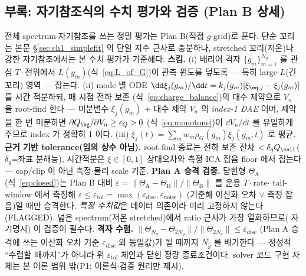 \subsection{부록: 자기참조식의 수치 평가와 검증 (Plan B 상세)}\label{sec:ch1_numeric}
전체 spectrum$\cdot$자기참조를 쓰는 정밀 평가는 Plan B(직접 $g$-grid)로 푼다. 단순 꼬리는 본문
\S\ref{sec:ch1_simplefit} 의 단일 지수 근사로 충분하나, stretched 꼬리(저온)나 강한 자기참조에서는 본 수치
평가가 기준해다.
\textbf{스킴.} (i) 배리어 격자 $\{g_m\}_{m=1}^{N_g}$ 를 관심 $T\cdot$전위에서 $L(g_m)$(식~\eqref{eq:L_of_G})이
관측 윈도를 덮도록 — 특히 large-$L$(긴 꼬리) 영역 — 잡는다. (ii) mode 별 ODE
$\dd\xi_j(g_m)/\dd t=k_j(g_m)[\xi_{\eq,j}-\xi_j(g_m)]$ 를 시간 적분하되, 매 시점 전하 보존
(식~\eqref{eq:charge_balance})의 대수 제약으로 $V_n$ 을 root-find 한다 — 미분변수 $\xi_j(g_m)$ + 대수 제약
$V_n$ 의 \emph{index-1 DAE} 이며, 제약을 한 번 미분하면 $\partial Q_\bg/\partial V_n\ge\epsilon_Q>0$
(식~\eqref{eq:monotone})이 $\dd V_n/\dd t$ 를 유일하게 주므로 index 가 정확히 1 이다. (iii)
$\xi_j(t)=\sum_m w_m\rho_G(g_m)\xi_j(g_m,t)$ 로 평균.
\textbf{근거 기반 tolerance(임의 상수 아님).} root-find 종료는 전하 보존 잔차 $<\delta_q Q_\cell$($\delta_q$=좌표
분해능), 시간적분은 $\xi\in[0,1]$ 상대오차와 측정 ICA 잡음 floor 에서 잡는다 — cap/clip 이 아닌 측정$\cdot$물리
scale 기준.
\textbf{Plan A 승격 검증.} 닫힌형 $\Theta_\mathrm A$(식~\eqref{eq:closed})는 Plan B 대비
$\varepsilon=\lVert\Theta_\mathrm A-\Theta_\mathrm B\rVert/\lVert\Theta_\mathrm B\rVert$ 를 운용 $T\cdot$rate$\cdot$
tail-window 에서 측정해 $\varepsilon\le\varepsilon_{\mathrm{tol}}=\max(\varepsilon_{\mathrm{disc}},\varepsilon_{\mathrm{noise}})$
(기준해 이산화 오차 $\vee$ 측정 잡음)일 때만 승격한다. \emph{특정 수치값}은 데이터 의존이라 미리 고정하지 않는다(FLAGGED). 넓은
spectrum(저온 stretched)에서 ratio 근사가 가장 열화하므로(\cite{jcp2017} 자기명시) 이 검증이 필수다.
\textbf{격자 수렴.} $\lVert\Theta_{N_g}-\Theta_{2N_g}\rVert/\lVert\Theta_{2N_g}\rVert\le\varepsilon_{\mathrm{disc}}$
(Plan A 승격에 쓰는 이산화 오차 기준 $\varepsilon_{\mathrm{disc}}$ 와 동일값)가 될 때까지 $N_g$ 를 배가한다 —
정성적 ``수렴할 때까지''가 아니라 위 $\varepsilon_{\mathrm{tol}}$ 체인과 닫힌 정량 종료조건이다. solver 코드 구현
자체는 본 이론 범위 밖(P1; 이론식$\cdot$검증 원리만 제시).

